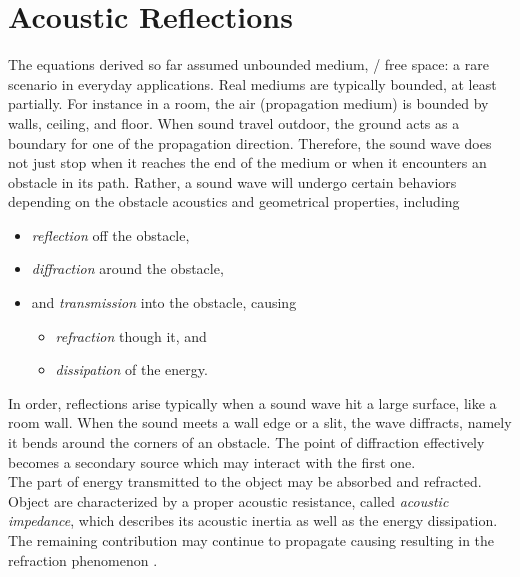 \section{Acoustic Reflections}\label{ch:acoustics:sec:reflection}
The equations derived so far assumed unbounded medium, \ie/ free space: a rare scenario in everyday applications.
Real mediums are typically bounded, at least partially.
For instance in a room, the air (propagation medium) is bounded by walls, ceiling, and floor.
When sound travel outdoor, the ground acts as a boundary for one of the propagation direction.
Therefore, the sound wave does not just stop when it reaches the end of the medium or when it encounters an obstacle in its path.
Rather, a sound wave will undergo certain behaviors depending on the obstacle acoustics and geometrical properties, including
\begin{itemize}
    \item \textit{reflection} off the obstacle,
    \item \textit{diffraction} around the obstacle,
    \item and \textit{transmission} into the obstacle, causing
    \begin{itemize}
        \item \textit{refraction} though it, and
        \item \textit{dissipation} of the energy.
    \end{itemize}
\end{itemize}

In order, reflections arise typically when a sound wave hit a large surface, like a room wall.
When the sound meets a wall edge or a slit, the wave diffracts, namely it bends around the corners of an obstacle.
The point of diffraction effectively becomes a secondary source which may interact with the first one.
\\The part of energy transmitted to the object may be absorbed and refracted.
Object are characterized by a proper acoustic resistance, called \textit{acoustic impedance}, which
describes its acoustic inertia as well as the energy dissipation.
The remaining contribution may continue to propagate causing resulting in the refraction phenomenon .

